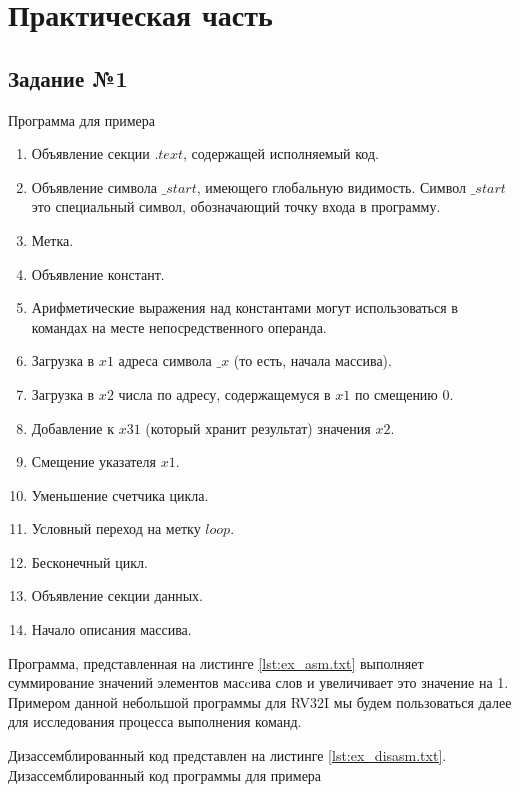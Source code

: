 \chapter{Практическая часть}

\section{Задание №1}

 {Программа для примера}

\begin{enumerate}[label=\arabic*)]
	\item Объявление секции $.text$, содержащей исполняемый код.
	\item Объявление символа $\_start$, имеющего глобальную видимость. Символ $\_start$ это специальный символ, обозначающий точку входа в программу.
	\item Метка.
	\item Объявление констант.
	\item Арифметические выражения над константами могут использоваться в командах
	на месте непосредственного операнда.
	\item Загрузка в $x1$ адреса символа $\_x$ (то есть, начала массива).
	\item Загрузка в $x2$ числа по адресу, содержащемуся в $x1$ по смещению 0.
	\item Добавление к $x31$ (который хранит результат) значения $x2$.
	\item Смещение указателя $x1$.
	\item Уменьшение счетчика цикла.
	\item Условный переход на метку $loop$.
	\item Бесконечный цикл.
	\item Объявление секции данных.
	\item Начало описания массива.
\end{enumerate}

Программа, представленная на листинге \ref{lst:ex_asm.txt} выполняет суммирование значений элементов масcива слов и увеличивает это значение на 1. Примером данной небольшой программы для RV32I мы будем пользоваться далее для исследования процесса выполнения команд.

\clearpage

Дизассемблированный код представлен на листинге \ref{lst:ex_disasm.txt}.
 {Дизассемблированный код программы для примера}

